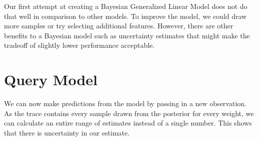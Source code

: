 \documentclass[12pt]{article}
\begin{document}
    Our first attempt at creating a Bayesian Generalized Linear Model does
not do that well in comparison to other models. To improve the model, we
could draw more samples or try selecting additional features. However,
there are other benefits to a Bayesian model such as uncertainty
estimates that might make the tradeoff of slightly lower performance
acceptable.

    \hypertarget{query-model}{%
\section{Query Model}\label{query-model}}

We can now make predictions from the model by passing in a new
observation. As the trace contains every sample drawn from the posterior
for every weight, we can calculate an entire range of estimates instead
of a single number. This shows that there is uncertainty in our
estimate.
\end{document}
